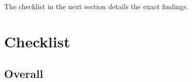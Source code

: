 \documentclass{report}
\begin{document}
The checklist in the next section details the exact findings.
\newpage 

\section*{Checklist}


		\subsection*{Overall}


\newcommand{\makerow}[1]{%
 #1 &
 \stepcounter{row}%
 \mbox{\CheckBox[print,name=Included\therow, width=0.7em, height=0.7em]{}} &
 \mbox{\CheckBox[print,name=Sufficient Time\therow, width=0.7em, height=0.7em]{}} &
 \mbox{\CheckBox[print,name=N/A\therow, width=0.7em, height=0.7em]{}} \\
}
\end{document}
